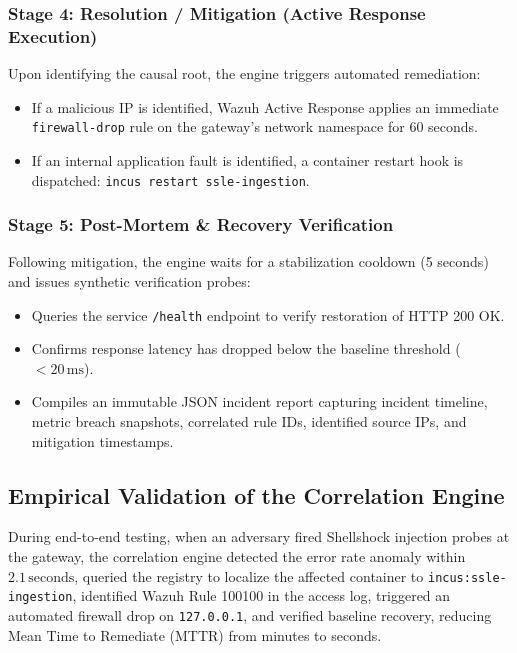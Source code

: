 \subsubsection{Stage 4: Resolution / Mitigation (Active Response Execution)}
Upon identifying the causal root, the engine triggers automated remediation:
\begin{itemize}
    \item If a malicious IP is identified, Wazuh Active Response applies an immediate \texttt{firewall-drop} rule on the gateway's network namespace for 60 seconds.
    \item If an internal application fault is identified, a container restart hook is dispatched: \texttt{incus restart ssle-ingestion}.
\end{itemize}

\subsubsection{Stage 5: Post-Mortem \& Recovery Verification}
Following mitigation, the engine waits for a stabilization cooldown (5 seconds) and issues synthetic verification probes:
\begin{itemize}
    \item Queries the service \texttt{/health} endpoint to verify restoration of HTTP 200 OK.
    \item Confirms response latency has dropped below the baseline threshold ($<20\,\text{ms}$).
    \item Compiles an immutable JSON incident report capturing incident timeline, metric breach snapshots, correlated rule IDs, identified source IPs, and mitigation timestamps.
\end{itemize}

\subsection{Empirical Validation of the Correlation Engine}
During end-to-end testing, when an adversary fired Shellshock injection probes at the gateway, the correlation engine detected the error rate anomaly within $2.1\,\text{seconds}$, queried the registry to localize the affected container to \texttt{incus:ssle-ingestion}, identified Wazuh Rule 100100 in the access log, triggered an automated firewall drop on \texttt{127.0.0.1}, and verified baseline recovery, reducing Mean Time to Remediate (MTTR) from minutes to seconds.
